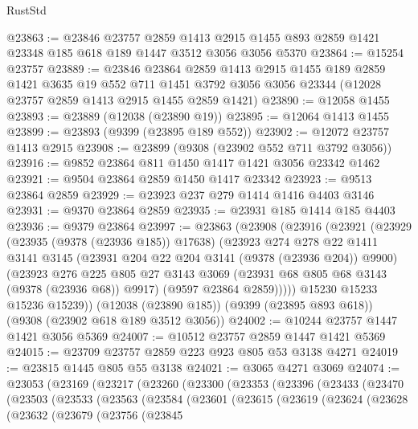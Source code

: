 \begin{lexlean}{RustStd}
\begin{coremodule}
@23863 := @23846
    @23757
    @2859
    @1413
    @2915
    @1455
    @893
    @2859
    @1421
    @23348
    @185
    @618
    @189
    @1447
    @3512
    @3056
    @3056
    @5370
@23864 := @15254 @23757
@23889 := @23846
    @23864
    @2859
    @1413
    @2915
    @1455
    @189
    @2859
    @1421
    @3635
    @19
    @552
    @711
    @1451
    @3792
    @3056
    @3056
    @23344
    (@12028 @23757 @2859 @1413 @2915 @1455 @2859 @1421)
@23890 := @12058 @1455
@23893 := @23889 (@12038 (@23890 @19))
@23895 := @12064 @1413 @1455
@23899 := @23893 (@9399 (@23895 @189 @552))
@23902 := @12072 @23757 @1413 @2915
@23908 := @23899 (@9308 (@23902 @552 @711 @3792 @3056))
@23916 := @9852 @23864 @811 @1450 @1417 @1421 @3056 @23342 @1462
@23921 := @9504 @23864 @2859 @1450 @1417 @23342
@23923 := @9513 @23864 @2859
@23929 := @23923 @237 @279 @1414 @1416 @4403 @3146
@23931 := @9370 @23864 @2859
@23935 := @23931 @185 @1414 @185 @4403
@23936 := @9379 @23864
@23997 := @23863
    (@23908
      (@23916
        (@23921
          (@23929
            (@23935 (@9378 (@23936 @185)) @17638)
            (@23923
              @274
              @278
              @22
              @1411
              @3141
              @3145
              (@23931 @204 @22 @204 @3141 (@9378 (@23936 @204)) @9900)
              (@23923
                @276
                @225
                @805
                @27
                @3143
                @3069
                (@23931 @68 @805 @68 @3143 (@9378 (@23936 @68)) @9917)
                (@9597 @23864 @2859)))))
        @15230
        @15233
        @15236
        @15239))
    (@12038 (@23890 @185))
    (@9399 (@23895 @893 @618))
    (@9308 (@23902 @618 @189 @3512 @3056))
@24002 := @10244 @23757 @1447 @1421 @3056 @5369
@24007 := @10512 @23757 @2859 @1447 @1421 @5369
@24015 := @23709 @23757 @2859 @223 @923 @805 @53 @3138 @4271
@24019 := @23815 @1445 @805 @55 @3138
@24021 := @3065 @4271 @3069
@24074 := @23053
    (@23169
      (@23217
        (@23260
          (@23300
            (@23353
              (@23396
                (@23433
                  (@23470
                    (@23503
                      (@23533
                        (@23563
                          (@23584
                            (@23601
                              (@23615
                                (@23619
                                  (@23624
                                    (@23628
                                      (@23632
                                        (@23679
                                          (@23756
                                            (@23845

\end{coremodule}
\end{lexlean}
